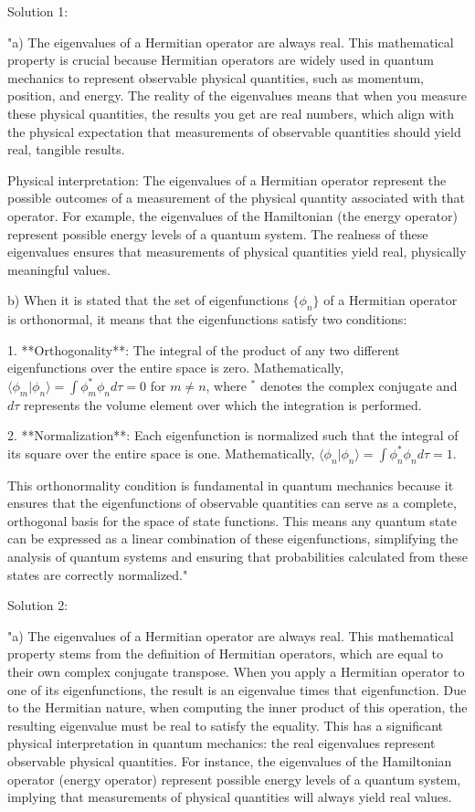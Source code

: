 Solution 1: 

"a) The eigenvalues of a Hermitian operator are always real. This mathematical property is crucial because Hermitian operators are widely used in quantum mechanics to represent observable physical quantities, such as momentum, position, and energy. The reality of the eigenvalues means that when you measure these physical quantities, the results you get are real numbers, which align with the physical expectation that measurements of observable quantities should yield real, tangible results.

Physical interpretation: The eigenvalues of a Hermitian operator represent the possible outcomes of a measurement of the physical quantity associated with that operator. For example, the eigenvalues of the Hamiltonian (the energy operator) represent possible energy levels of a quantum system. The realness of these eigenvalues ensures that measurements of physical quantities yield real, physically meaningful values.

b) When it is stated that the set of eigenfunctions \(\{\phi_{n}\}\) of a Hermitian operator is orthonormal, it means that the eigenfunctions satisfy two conditions:

1. **Orthogonality**: The integral of the product of any two different eigenfunctions over the entire space is zero. Mathematically, \(\langle \phi_{m} | \phi_{n} \rangle = \int \phi_{m}^* \phi_{n} d\tau = 0\) for \(m \neq n\), where \(^*\) denotes the complex conjugate and \(d\tau\) represents the volume element over which the integration is performed.

2. **Normalization**: Each eigenfunction is normalized such that the integral of its square over the entire space is one. Mathematically, \(\langle \phi_{n} | \phi_{n} \rangle = \int \phi_{n}^* \phi_{n} d\tau = 1\).

This orthonormality condition is fundamental in quantum mechanics because it ensures that the eigenfunctions of observable quantities can serve as a complete, orthogonal basis for the space of state functions. This means any quantum state can be expressed as a linear combination of these eigenfunctions, simplifying the analysis of quantum systems and ensuring that probabilities calculated from these states are correctly normalized."

Solution 2: 

"a) The eigenvalues of a Hermitian operator are always real. This mathematical property stems from the definition of Hermitian operators, which are equal to their own complex conjugate transpose. When you apply a Hermitian operator to one of its eigenfunctions, the result is an eigenvalue times that eigenfunction. Due to the Hermitian nature, when computing the inner product of this operation, the resulting eigenvalue must be real to satisfy the equality. This has a significant physical interpretation in quantum mechanics: the real eigenvalues represent observable physical quantities. For instance, the eigenvalues of the Hamiltonian operator (energy operator) represent possible energy levels of a quantum system, implying that measurements of physical quantities will always yield real values.


